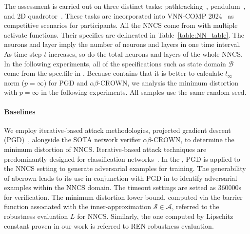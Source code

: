 \documentclass[conference]{IEEEtran}
\newcommand{\abcrown}{$\alpha\beta$-CROWN\xspace}
\newcommand{\ren}{\textsc{REN}\xspace}
\newcommand{\nncs}{\textsc{NNCS}\xspace}
\newcommand{\calA}{\mathcal{A}}
\newcommand{\calB}{\mathcal{B}}
\newcommand{\calS}{\mathcal{S}}
\begin{document}
The assessment is carried out on three distinct tasks: 
pathtracking~\cite{snider2009automatic}, 
pendulum~\cite{mori1976control}, 
and 2D quadrotor~\cite{bouabdallah2007full}. 
These tasks are incorporated into VNN-COMP 
2024~\cite{brix2024fifth} as competitive scenarios 
for participants. 
All the \nncs come from \cite{yanglyapunov} 
with multiple activate functions. 
Their specifics are delineated in 
Table~\ref{table:NN_table}. 
The neurons and layer imply the number of neurons and 
layers in one time interval. As time step $t$ increases, 
so do the total neurons and layers of the whole \nncs. 
In the following experiments, all of the 
specifications such 
as state domain $\calB$ 
come from the spec.file in \cite{yanglyapunov}. 
Because \cite{yanglyapunov} contains that it is better 
to calculate $l_{\infty}$ norm ($p = \infty$) for 
PGD and \abcrown, we 
analysis the minimum distortion with $p = \infty$ in the 
following experiments. 
All samples use the same random seed. 

\paragraph{Baselines}
We employ iterative-based attack methodologies, 
projected gradient descent (PGD)~\cite{madry2017towards}, 
alongside the SOTA network verifier \abcrown, 
to determine the minimum distortion of \nncs. 
Iterative-based attack techniques are predominantly 
designed for classification networks~\cite{madry2017towards,du2021fast}. 
In the \cite{yanglyapunov}, PGD is applied 
to the \nncs setting to generate adversarial examples 
for training. 
The generability of abcrown 
leads to its use in 
conjunction with PGD in \cite{yanglyapunov} to 
identify adversarial examples 
within the \nncs domain. 
The timeout settings are setted as 360000s for 
verification. 
The minimum distortion lower bound, 
computed via the barrier function 
associated with the inner-approximation $\calS\in \calA$, 
referred to the robustness evaluation $L$ 
for \nncs. Similarly, the one computed by 
Lipschitz constant proven in our work is referred to 
\ren robustness evaluation. 
\end{document}
